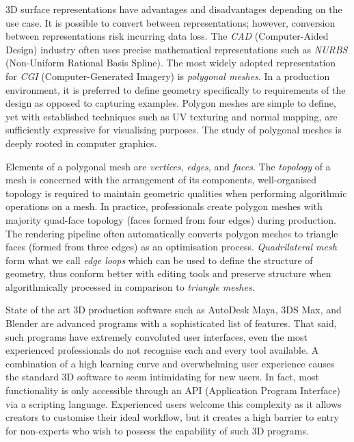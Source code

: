 \documentclass[ %
author={Dillon Keith Diep},
supervisor={Dr. Carl Henrik Ek},
degree={MEng},
title={ART-CG Hair:},
subtitle={Assisted Real-time Content Generation of Stylised Virtual Hair},
type={Research},
year={2017} ]{dissertation}
\begin{document}
3D surface representations have advantages and disadvantages depending on the use case. It is possible to convert between representations; however, conversion between representations risk incurring data loss. The \textit{CAD} (Computer-Aided Design) industry often uses precise mathematical representations such as \textit{NURBS} (Non-Uniform Rational Basis Spline). The most widely adopted representation for \textit{CGI} (Computer-Generated Imagery) is \textit{polygonal meshes}. In a production environment, it is preferred to define geometry specifically to requirements of the design as opposed to capturing examples. Polygon meshes are simple to define, yet with established techniques such as UV texturing and normal mapping, are sufficiently expressive for visualising purposes. The study of polygonal meshes is deeply rooted in computer graphics.

Elements of a polygonal mesh are \textit{vertices}, \textit{edges}, and \textit{faces}. The \textit{topology} of a mesh is concerned with the arrangement of its components, well-organised topology is required to maintain geometric qualities when performing algorithmic operations on a mesh. In practice, professionals create polygon meshes with majority quad-face topology (faces formed from four edges) during production. The rendering pipeline often automatically converts polygon meshes to triangle faces (formed from three edges) as an optimisation process. \textit{Quadrilateral mesh} form what we call \textit{edge loops} which can be used to define the structure of geometry, thus conform better with editing tools and preserve structure when algorithmically processed in comparison to \textit{triangle meshes}.

State of the art 3D production software such as AutoDesk Maya, 3DS Max, and Blender are advanced programs with a sophisticated list of features. That said, such programs have extremely convoluted user interfaces, even the most experienced professionals do not recognise each and every tool available. A combination of a high learning curve and overwhelming user experience causes the standard 3D software to seem intimidating for new users. In fact, most functionality is only accessible through an API (Application Program Interface) via a scripting language.  Experienced users welcome this complexity as it allows creators to customise their ideal workflow, but it creates a high barrier to entry for non-experts who wish to possess the capability of such 3D programs.

\end{document}
